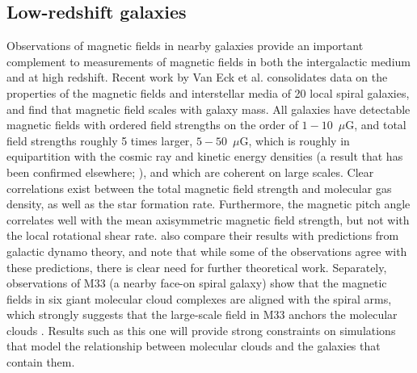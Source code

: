 \vspace{-3mm}
\subsection{Low-redshift galaxies}
\label{sec:lowz}
\vspace{-2mm}



Observations of magnetic fields in nearby galaxies provide an
important complement to measurements of magnetic fields in both the
intergalactic medium and at high redshift.  Recent work by Van Eck
et al. \cite{2014arXiv1411.1386V} consolidates data on the properties
of the magnetic fields and interstellar media of 20 local spiral
galaxies, and \citet{Tabatabaei16} find that magnetic field scales with galaxy
mass.
All galaxies have detectable
magnetic fields with ordered field strengths on the order of $1-10$~$\mu$G, and
total field strengths roughly 5 times larger, $5-50$~$\mu$G, which is
roughly in equipartition with the cosmic ray and kinetic energy
densities (a result that has been confirmed elsewhere; \cite{Mao12,
Beck13}), and which are coherent on large scales.  Clear correlations
exist between the total magnetic field strength and molecular gas
density, as well as the star formation rate.  Furthermore, the
magnetic pitch angle correlates well with the mean axisymmetric
magnetic field strength, but not with the local rotational shear rate.
\citet{2014arXiv1411.1386V} also compare their results with predictions from galactic
dynamo theory, and note that while some of the observations agree with
these predictions, there is clear need for further theoretical work.
Separately, observations of M33 (a nearby face-on spiral galaxy) show
that the magnetic fields in six giant molecular cloud complexes are
aligned with the spiral arms, which strongly suggests that the
large-scale field in M33 anchors the molecular clouds
\citep{2011Natur.479..499L}.  Results such as this one will provide
strong constraints on simulations that model the relationship between
molecular clouds and the galaxies that contain them. 

